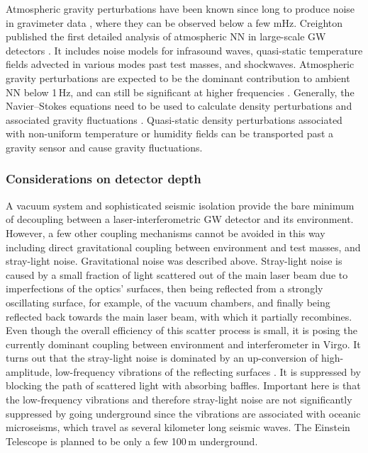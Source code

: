 Atmospheric gravity perturbations have been known since long to produce noise in gravimeter data \cite{Neu2010}, where they can be observed below a few mHz. Creighton published the first detailed analysis of atmospheric NN in large-scale GW detectors \cite{Cre2008}. It includes noise models for infrasound waves, quasi-static temperature fields advected in various modes past test masses, and shockwaves. Atmospheric gravity perturbations are expected to be the dominant contribution to ambient NN below 1\,Hz, and can still be significant at higher frequencies \cite{FiEA2018}. Generally, the Navier--Stokes equations need to be used to calculate density perturbations and associated gravity fluctuations \cite{Dav2004}. Quasi-static density perturbations associated with non-uniform temperature or humidity fields can be transported past a gravity sensor and cause gravity fluctuations. 

\subsubsection*{Considerations on detector depth}
\label{sec:depthNN}
A vacuum system and sophisticated seismic isolation provide the bare minimum of decoupling between a laser-interferometric GW detector and its environment. However, a few other coupling mechanisms cannot be avoided in this way including direct gravitational coupling between environment and test masses, and stray-light noise. Gravitational noise was described above. Stray-light noise is caused by a small fraction of light scattered out of the main laser beam due to imperfections of the optics' surfaces, then being reflected from a strongly oscillating surface, for example, of the vacuum chambers, and finally being reflected back towards the main laser beam, with which it partially recombines. Even though the overall efficiency of this scatter process is small, it is posing the currently dominant coupling between environment and interferometer in Virgo. It turns out that the stray-light noise is dominated by an up-conversion of high-amplitude, low-frequency vibrations of the reflecting surfaces \cite{CaEA2013}. It is suppressed by blocking the path of scattered light with absorbing baffles. Important here is that the low-frequency vibrations and therefore stray-light noise are not significantly suppressed by going underground since the vibrations are associated with oceanic microseisms, which travel as several kilometer long seismic waves. The Einstein Telescope is planned to be only a few 100\,m underground. 

